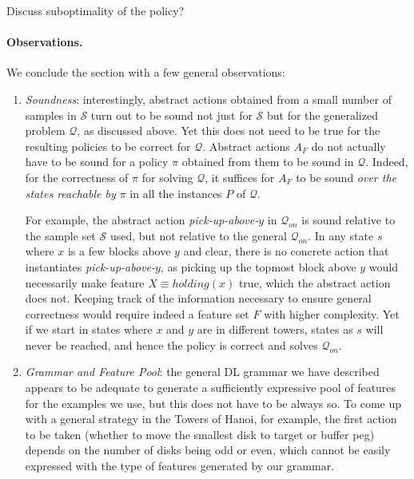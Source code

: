 \documentclass[letterpaper]{article} %
\newcommand{\Q}{\mathcal{Q}}
\begin{document}
Discuss suboptimality of the policy?

% 



\paragraph{Observations.}
We conclude the section with a few general observations:

\begin{enumerate}
\item
\emph{Soundness}: interestingly, abstract actions obtained from a small number of samples in
$\mathcal{S}$ turn out to be sound not just for $\mathcal{S}$ but for the generalized problem $\Q$,
as discussed above. Yet this does not need to be true for the resulting policies to be
correct for $\Q$.
%
Abstract actions $A_F$ do not actually have to be sound for a policy $\pi$
obtained from them to be sound in $\Q$.
Indeed, for the correctness of $\pi$ for solving $\Q$,
it suffices for $A_F$ to be sound \emph{over the states reachable by $\pi$}
in all the instances $P$ of $\Q$.

For example, the abstract action \emph{pick-up-above-$y$} in $\Q_{on}$
is sound relative to the sample set $\mathcal{S}$ used, but not relative to the general
$\Q_{on}$. In any state $s$ where $x$ is a few blocks above $y$ and clear,
there is no concrete action that instantiates \emph{pick-up-above-$y$},
as picking up the topmost block above $y$ would necessarily make feature $X \equiv holding(x)$
true, which the abstract action does not.
%
Keeping track of the information necessary to ensure general correctness would require indeed
a feature set $F$ with higher complexity.
Yet if we start in states where $x$ and $y$ are in different towers,
states as $s$ will never be reached, and hence the policy is correct and solves $\Q_{on}$.


\item
\emph{Grammar and Feature Pool}: the general DL grammar we have described appears to be
adequate to generate a sufficiently expressive pool of features for the examples we use,
but this does not have to be always so.
To come up with a general strategy in the Towers of Hanoi, for example,
the first action to be taken  (whether to move the smallest disk to target or buffer peg)
depends on the number of disks being odd or even,
which cannot be easily expressed with the type of features generated by our grammar.


\end{enumerate}
\end{document}
